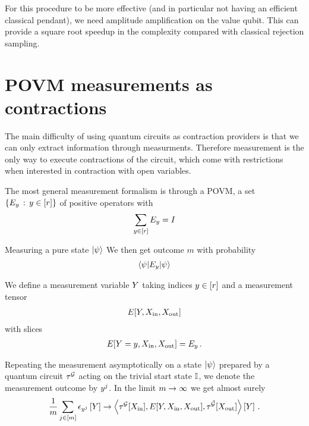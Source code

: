 \documentclass[aps,onecolumn,nofootinbib,pra]{article}
\begin{document}
    For this procedure to be more effective (and in particular not having an efficient classical pendant), we need amplitude amplification on the value qubit.
    This can provide a square root speedup in the complexity compared with classical rejection sampling.


    \section{POVM measurements as contractions}

    The main difficulty of using quantum circuits as contraction providers is that we can only extract information through measurments.
    Therefore measurement is the only way to execute contractions of the circuit, which come with restrictions when interested in contraction with open variables.

    The most general measurement formalism is through a POVM, a set $\{E_y \, : \, y\in[r]\}$ of positive operators with %
    \begin{align*}
        \sum_{y\in[r]} E_y = I
    \end{align*}

    Measuring a pure state $\ket{\psi}$ We then get outcome $m$ with probability
    \begin{align*}
        \braket{\psi|E_y|\psi}
    \end{align*}

    We define a measurement variable $Y$ taking indices $y\in[r]$ and a measurement tensor
    \begin{align*}
        E[Y,X_{\mathrm{in}},X_{\mathrm{out}}]
    \end{align*}
    with slices
    \begin{align*}
        E[Y=y,X_{\mathrm{in}},X_{\mathrm{out}}] = E_y \, .
    \end{align*}

    Repeating the measurement asymptotically on a state $\ket{\psi}$ prepared by a quantum circuit $\tau^{\mathcal{G}}$ acting on the trivial start state $\mathbb{I}$, we denote the measurement outcome by $y^j$.
    In the limit $m\rightarrow\infty$ we get almost surely
    \begin{align*}
        \frac{1}{m} \sum_{j\in[m]} \epsilon_{y^j}\left[Y\right] \rightarrow
        \left\langle \tau^{\mathcal{G}}[X_{\mathrm{in}}],E[Y,X_{\mathrm{in}},X_{\mathrm{out}}],\tau^{\tilde{\mathcal{G}}}[X_{\mathrm{out}}]\right\rangle \left[ Y \right] \, .
    \end{align*}
\end{document}
